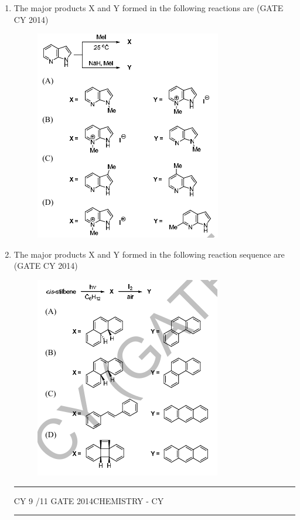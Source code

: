 \documentclass[a4paper,10pt]{exam}
\theoremstyle{remark}
\begin{document}
\begin{enumerate}
\item  The major products X and Y formed in the following reactions are \hfill{(GATE CY 2014)}

\begin{figure}[H]
    \centering
    \includegraphics[width=0.5\columnwidth]{figs/Q 48.png}
    \caption{}
    \label{fig:placeholder}
\end{figure}

\item The major products X and Y formed in the following reaction sequence are \hfill{(GATE CY 2014)}
\begin{figure}[H]
    \centering
    \includegraphics[width=0.5\columnwidth]{figs/Q 49.png}
    \caption{}
    \label{fig:placeholder}
\end{figure}
\vfill
\noindent\rule{\linewidth}{0.4pt}
CY \hfill 9 /11
\newpage
GATE 2014\hfill CHEMISTRY - CY\\
\noindent\rule{\linewidth}{0.4pt}


\end{enumerate}
\end{document}
